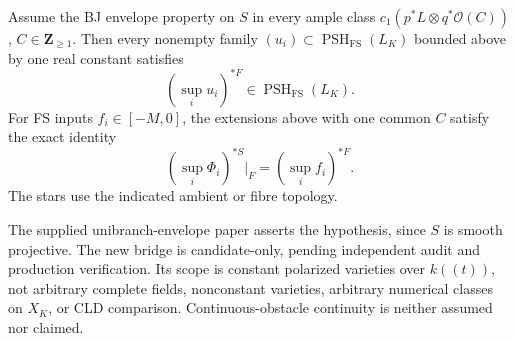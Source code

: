 \begin{theorem}\label{thm:p081-constant-laurent-envelope-transfer-candidate}
Assume the BJ envelope property on \(S\) in every ample class
\(c_1(p^*L\otimes q^*\mathcal O(C))\), \(C\in\mathbf Z_{\geq1}\).
Then every nonempty family \((u_i)\subset
\operatorname{PSH}_{\mathrm{FS}}(L_K)\) bounded above by one real
constant satisfies
\[
                  (\sup_i u_i)^{*F}
                       \in\operatorname{PSH}_{\mathrm{FS}}(L_K).
\]
For FS inputs \(f_i\in[-M,0]\), the extensions above with one common
\(C\) satisfy the exact identity
\begin{equation}\label{eq:p081-uniform-usc-fibre}
              (\sup_i\Phi_i)^{*S}|_F=(\sup_i f_i)^{*F}.
\end{equation}
The stars use the indicated ambient or fibre topology.
\end{theorem}

The supplied unibranch-envelope paper asserts the hypothesis, since
\(S\) is smooth projective. The new bridge is candidate-only, pending
independent audit and production verification. Its scope is constant
polarized varieties over \(k((t))\), not arbitrary complete fields,
nonconstant varieties, arbitrary numerical classes on \(X_K\), or CLD
comparison. Continuous-obstacle continuity is neither assumed nor claimed.
